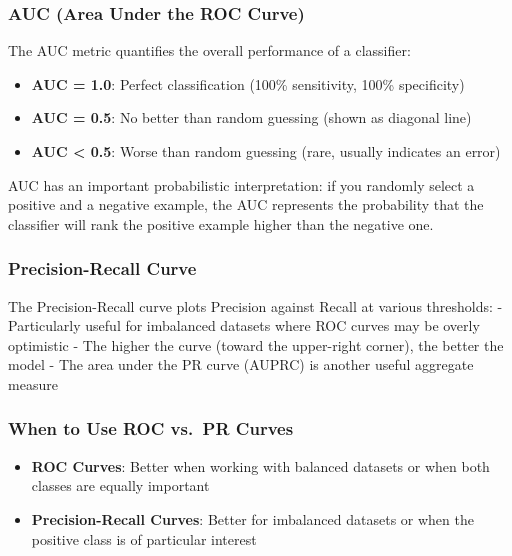 \documentclass[
  letterpaper,
  DIV=11,
  numbers=noendperiod]{scrreprt}
\providecommand{\tightlist}{%
  \setlength{\itemsep}{0pt}\setlength{\parskip}{0pt}}\usepackage{longtable,booktabs,array}
\begin{document}
\subsubsection{AUC (Area Under the ROC
Curve)}\label{auc-area-under-the-roc-curve}

The AUC metric quantifies the overall performance of a classifier:

\begin{itemize}
\tightlist
\item
  \textbf{AUC = 1.0}: Perfect classification (100\% sensitivity, 100\%
  specificity)
\item
  \textbf{AUC = 0.5}: No better than random guessing (shown as diagonal
  line)
\item
  \textbf{AUC \textless{} 0.5}: Worse than random guessing (rare,
  usually indicates an error)
\end{itemize}

AUC has an important probabilistic interpretation: if you randomly
select a positive and a negative example, the AUC represents the
probability that the classifier will rank the positive example higher
than the negative one.

\subsubsection{Precision-Recall Curve}\label{precision-recall-curve}

The Precision-Recall curve plots Precision against Recall at various
thresholds: - Particularly useful for imbalanced datasets where ROC
curves may be overly optimistic - The higher the curve (toward the
upper-right corner), the better the model - The area under the PR curve
(AUPRC) is another useful aggregate measure

\subsubsection{When to Use ROC vs.~PR
Curves}\label{when-to-use-roc-vs.-pr-curves}

\begin{itemize}
\tightlist
\item
  \textbf{ROC Curves}: Better when working with balanced datasets or
  when both classes are equally important
\item
  \textbf{Precision-Recall Curves}: Better for imbalanced datasets or
  when the positive class is of particular interest
\end{itemize}
\end{document}
